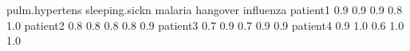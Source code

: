 \begin{Schunk}
% --begin: "comp.quant.some"
\begin{Soutput}
         pulm.hypertens sleeping.sickn malaria hangover influenza
patient1            0.9            0.9     0.9      0.8       1.0
patient2            0.8            0.8     0.8      0.8       0.9
patient3            0.7            0.9     0.7      0.9       0.9
patient4            0.9            1.0     0.6      1.0       1.0
\end{Soutput}
%
% --end: "comp.quant.some"
\end{Schunk}
